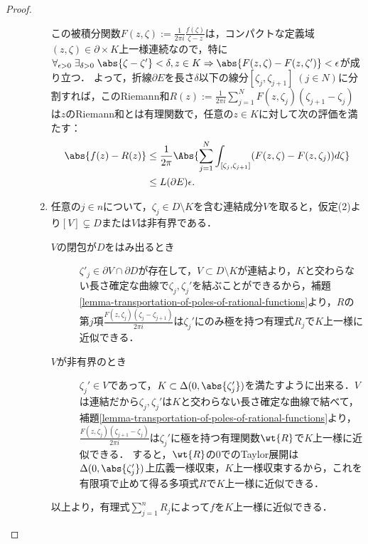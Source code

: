 \documentclass[uplatex, dvipdfmx]{jsreport}
\begin{document}
\begin{proof}
\begin{description}
\begin{enumerate}
            この被積分関数$F(z,\zeta):=\frac{1}{2\pi i}\frac{f(\zeta)}{\zeta-z}$は，コンパクトな定義域$(z,\zeta)\in\partial\times K$上一様連続なので，特に$\forall_{\epsilon>0}\;\exists_{\delta>0}\;\abs{\zeta-\zeta'}<\delta,z\in K\Rightarrow\abs{F(z,\zeta)-F(z,\zeta')}<\epsilon$が成り立つ．
            よって，折線$\partial E$を長さ$\delta$以下の線分$[\zeta_j,\zeta_{j+1}]\;(j\in N)$に分割すれば，このRiemann和$R(z):=\frac{1}{2\pi i}\sum^N_{j=1}F(z,\zeta_j)(\zeta_{j+1}-\zeta_j)$は$z$のRiemann和とは有理関数で，任意の$z\in K$に対して次の評価を満たす：
            \begin{align*}
                \abs{f(z)-R(z)}&\le\frac{1}{2\pi}\Abs{\sum^N_{j=1}\int_{[\zeta_j,\zeta_{j+1}]}(F(z,\zeta)-F(z,\zeta_j))d\zeta}\\
                &\le L(\partial E)\epsilon.
            \end{align*}
            \item 
            任意の$j\in n$について，$\zeta_j\in D\setminus K$を含む連結成分$V$を取ると，仮定(2)より$[V]\subsetneq D$または$V$は非有界である．
            \begin{description}
                \item[$V$の閉包が$D$をはみ出るとき] $\zeta'_j\in\partial V\cap\partial D$が存在して，$V\subset D\setminus K$が連結より，$K$と交わらない長さ確定な曲線で$\zeta_j,\zeta_j'$を結ぶことができるから，補題\ref{lemma-transportation-of-poles-of-rational-functions}より，$R$の第$j$項$\frac{F(z,\zeta_j)(\zeta_j-\zeta_{j+1})}{2\pi i}$は$\zeta_j'$にのみ極を持つ有理式$R_j$で$K$上一様に近似できる．
                \item[$V$が非有界のとき] $\zeta_j'\in V$であって，$K\subset\Delta(0,\abs{\zeta_j'})$を満たすように出来る．$V$は連結だから$\zeta_j,\zeta_j'$は$K$と交わらない長さ確定な曲線で結べて，補題\ref{lemma-transportation-of-poles-of-rational-functions}より，$\frac{F(z,\zeta_j)(\zeta_{j+1}-\zeta_j)}{2\pi i}$は$\zeta_j'$に極を持つ有理関数$\wt{R}$で$K$上一様に近似できる．
                すると，$\wt{R}$の$0$でのTaylor展開は$\Delta(0,\abs{\zeta_j'})$上広義一様収束，$K$上一様収束するから，これを有限項で止めて得る多項式$R$で$K$上一様に近似できる．
            \end{description}
            以上より，有理式$\sum_{j=1}^nR_j$によって$f$を$K$上一様に近似できる．
        \end{enumerate}
    \end{description}
\end{proof}
\end{document}
